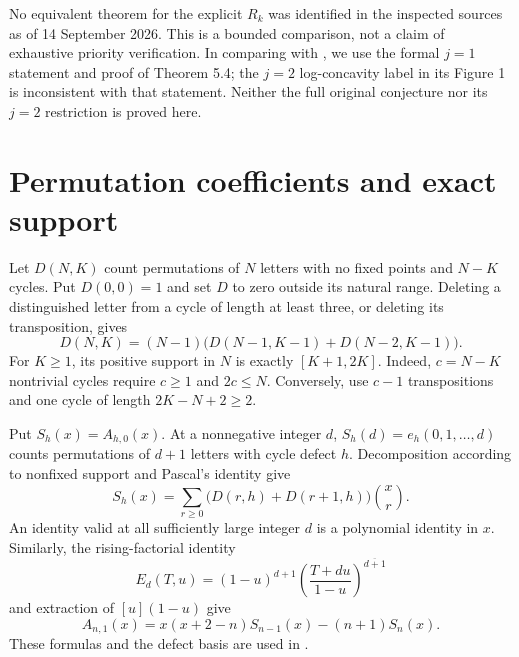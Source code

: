 \documentclass[11pt]{article}
\begin{document}
No equivalent theorem for the explicit $R_k$ was identified in the
inspected sources as of 14 September 2026. This is a bounded comparison,
not a claim of exhaustive priority verification. In comparing with
\cite{BercziFeher2026}, we use the formal $j=1$ statement and proof of
Theorem 5.4; the $j=2$ log-concavity label in its Figure 1 is inconsistent
with that statement. Neither the full original conjecture nor its $j=2$
restriction is proved here.

\section{Permutation coefficients and exact support}

Let $D(N,K)$ count permutations of $N$ letters with no fixed points and
$N-K$ cycles. Put $D(0,0)=1$ and set $D$ to zero outside its natural
range. Deleting a distinguished letter from a cycle of length at least
three, or deleting its transposition, gives
\begin{equation}\label{eq:defect}
D(N,K)=(N-1)\bigl(D(N-1,K-1)+D(N-2,K-1)\bigr).
\end{equation}
For $K\geq1$, its positive support in $N$ is exactly $[K+1,2K]$.
Indeed, $c=N-K$ nontrivial cycles require $c\geq1$ and $2c\leq N$.
Conversely, use $c-1$ transpositions and one cycle of length
$2K-N+2\geq2$.

Put $S_h(x)=A_{h,0}(x)$. At a nonnegative integer $d$,
$S_h(d)=e_h(0,1,\ldots,d)$ counts permutations of $d+1$ letters with
cycle defect $h$. Decomposition according to nonfixed support and
Pascal's identity give
\begin{equation}\label{eq:zeroth}
S_h(x)=\sum_{r\geq0}\bigl(D(r,h)+D(r+1,h)\bigr)\binom{x}{r}.
\end{equation}
An identity valid at all sufficiently large integer $d$ is a polynomial
identity in $x$. Similarly, the rising-factorial identity
\[
E_d(T,u)=(1-u)^{d+1}
\left(\frac{T+du}{1-u}\right)^{\overline{d+1}}
\]
and extraction of $[u](1-u)$ give
\begin{equation}\label{eq:first}
A_{n,1}(x)=x(x+2-n)S_{n-1}(x)-(n+1)S_n(x).
\end{equation}
These formulas and the defect basis are used in
\cite[Section 3]{BercziFeher2026}.
\end{document}
